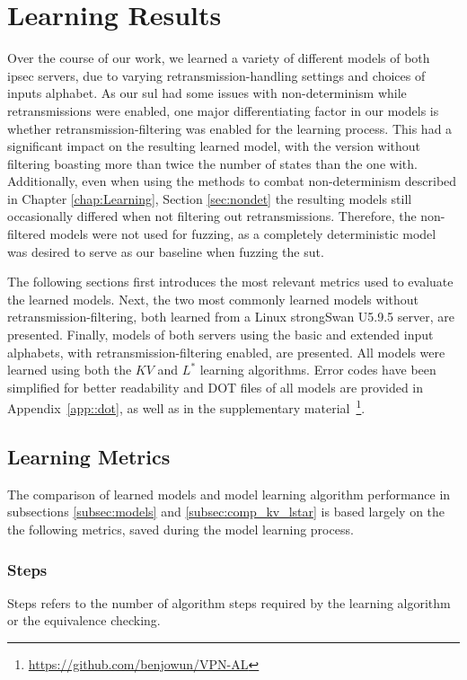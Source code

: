 \section{Learning Results} \label{sec:learnresults}
Over the course of our work, we learned a variety of different models of both \ac{ipsec} servers, due to varying retransmission-handling settings and choices of inputs alphabet. As our \ac{sul} had some issues with non-determinism while retransmissions were enabled, one major differentiating factor in our models is whether retransmission-filtering was enabled for the learning process. This had a significant impact on the resulting learned model, with the version without filtering boasting more than twice the number of states than the one with. Additionally, even when using the methods to combat non-determinism described in Chapter \ref{chap:Learning}, Section \ref{sec:nondet} the resulting models still occasionally differed when not filtering out retransmissions. Therefore, the non-filtered models were not used for fuzzing, as a completely deterministic model was desired to serve as our baseline when fuzzing the \ac{sut}.

The following sections first introduces the most relevant metrics used to evaluate the learned models. Next, the two most commonly learned models without retransmission-filtering, both learned from a Linux strongSwan U5.9.5 server, are presented. Finally, models of both servers using the basic and extended input alphabets, with retransmission-filtering enabled, are presented. All models were learned using both the $KV$ and $L^*$ learning algorithms. Error codes have been simplified for better readability and DOT files of all models are provided in Appendix~\ref{app::dot}, as well as in the supplementary material~\footnote{\url{https://github.com/benjowun/VPN-AL}}.

\newpage

\subsection{Learning Metrics} \label{subsec:metrics}
The comparison of learned models and model learning algorithm performance in subsections \ref{subsec:models} and \ref{subsec:comp_kv_lstar} is based largely on the the following metrics, saved during the model learning process.

\subsubsection*{Steps}
Steps refers to the number of algorithm steps required by the learning algorithm or the equivalence checking.

